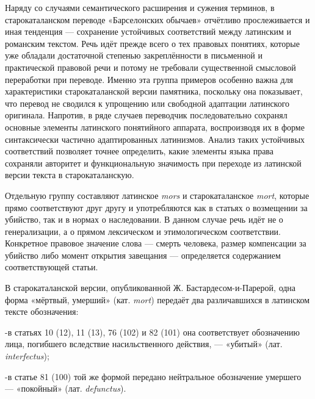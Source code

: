 Наряду со случаями семантического расширения и сужения терминов, в старокаталанском переводе «Барселонских обычаев» отчётливо прослеживается и иная тенденция --- сохранение устойчивых соответствий между латинским и романским текстом. Речь идёт прежде всего о тех правовых понятиях, которые уже обладали достаточной степенью закреплённости в письменной и практической правовой речи и потому не требовали существенной смысловой переработки при переводе. Именно эта группа примеров особенно важна для характеристики старокаталанской версии памятника, поскольку она показывает, что перевод не сводился к упрощению или свободной адаптации латинского оригинала. Напротив, в ряде случаев переводчик последовательно сохранял основные элементы латинского понятийного аппарата, воспроизводя их в форме синтаксически частично адаптированных латинизмов. Анализ таких устойчивых соответствий позволяет точнее определить, какие элементы языка права сохраняли авторитет и функциональную значимость при переходе из латинской версии текста в старокаталанскую.

Отдельную группу составляют латинское \emph{mors} и старокаталанское \emph{mort}, которые прямо соответствуют друг другу и употребляются как в статьях о возмещении за убийство, так и в нормах о наследовании. В данном случае речь идёт не о генерализации, а о прямом лексическом и этимологическом соответствии. Конкретное правовое значение слова --- смерть человека, размер компенсации за убийство либо момент открытия завещания --- определяется содержанием соответствующей статьи.

В старокаталанской версии, опубликованной Ж. Бастардесом-и-Парерой, одна форма «мёртвый, умерший» (кат. \emph{mort}) передаёт два различавшихся в латинском тексте обозначения:

-в статьях 10 (12), 11 (13), 76 (102) и 82 (101) она соответствует обозначению лица, погибшего вследствие насильственного действия, --- «убитый» (лат. \emph{interfectus});

-в статье 81 (100) той же формой передано нейтральное обозначение умершего --- «покойный» (лат. \emph{defunctus}).


